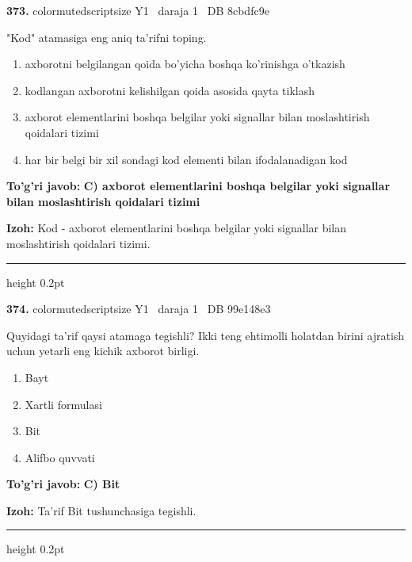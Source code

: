 \documentclass[10pt,a4paper,oneside]{article}
\begin{document}
\noindent\textbf{\color{ink}373.}  {color{muted}scriptsize Y1 \textbullet\ daraja 1 \textbullet\ DB 8cbdfc9e}
\par
"Kod" atamasiga eng aniq ta'rifni toping.
\begin{enumerate}[label=\Alph*),leftmargin=9mm]
\item axborotni belgilangan qoida bo'yicha boshqa ko'rinishga o'tkazish
\item kodlangan axborotni kelishilgan qoida asosida qayta tiklash
\item axborot elementlarini boshqa belgilar yoki signallar bilan moslashtirish qoidalari tizimi
\item har bir belgi bir xil sondagi kod elementi bilan ifodalanadigan kod
\end{enumerate}
\begin{tcolorbox}[enhanced,breakable,colback=teal!4,colframe=teal!50!black,boxrule=0.5pt,arc=1.1mm,left=3mm,right=3mm,top=1.7mm,bottom=1.7mm,before skip=2mm,after skip=2mm]
\textbf{\color{teal}To'g'ri javob:} \textbf{C) axborot elementlarini boshqa belgilar yoki signallar bilan moslashtirish qoidalari tizimi}
\par\smallskip
\textbf{Izoh:} Kod - axborot elementlarini boshqa belgilar yoki signallar bilan moslashtirish qoidalari tizimi.
\end{tcolorbox}
\vspace{2mm}\hrule height 0.2pt \vspace{3mm}

\noindent\textbf{\color{ink}374.}  {color{muted}scriptsize Y1 \textbullet\ daraja 1 \textbullet\ DB 99e148e3}
\par
Quyidagi ta'rif qaysi atamaga tegishli? Ikki teng ehtimolli holatdan birini ajratish uchun yetarli eng kichik axborot birligi.
\begin{enumerate}[label=\Alph*),leftmargin=9mm]
\item Bayt
\item Xartli formulasi
\item Bit
\item Alifbo quvvati
\end{enumerate}
\begin{tcolorbox}[enhanced,breakable,colback=teal!4,colframe=teal!50!black,boxrule=0.5pt,arc=1.1mm,left=3mm,right=3mm,top=1.7mm,bottom=1.7mm,before skip=2mm,after skip=2mm]
\textbf{\color{teal}To'g'ri javob:} \textbf{C) Bit}
\par\smallskip
\textbf{Izoh:} Ta'rif Bit tushunchasiga tegishli.
\end{tcolorbox}
\vspace{2mm}\hrule height 0.2pt \vspace{3mm}
\end{document}
